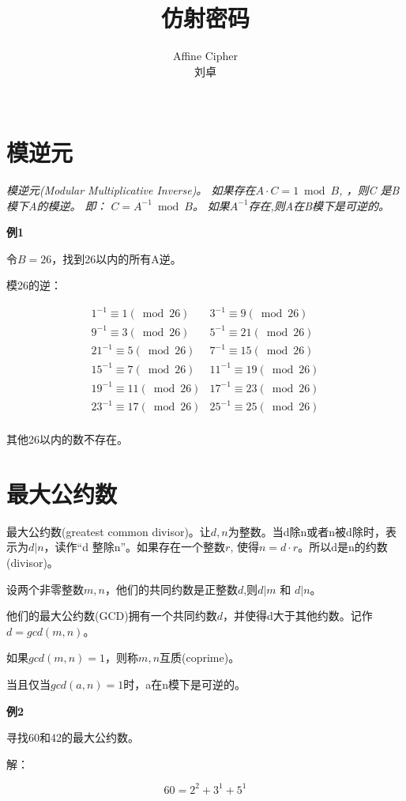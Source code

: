 \documentclass{article}
\date{}
\title{仿射密码}
\author{
Affine Cipher\\
 刘卓\\
 \texttt{ } \\
}
\begin{document}
\maketitle

\section{模逆元}
\textit{模逆元(Modular Multiplicative Inverse)。 如果存在$A \cdot C = 1 \bmod B$, ，则C
是B模下A的模逆。 即： $C = A^{-1} \bmod B$。}
\textit{
如果$A^{-1}$存在,则A在B模下是可逆的。
}

\textbf{例1}

令$B = 26$，找到26以内的所有A逆。

模26的逆：

$$
\begin{array}{cc}
 {1^{-1} \equiv 1(\bmod 26)} & 3^{-1} \equiv 9(\bmod 26) \\
 9^{-1} \equiv 3(\bmod 26) & 5^{-1} \equiv 21(\bmod 26) \\ 
 21^{-1} \equiv 5(\bmod 26) & 7^{-1} \equiv 15(\bmod 26) \\ 
 15^{-1} \equiv 7(\bmod 26) & 11^{-1} \equiv 19(\bmod 26) \\
 19^{-1} \equiv 11(\bmod 26) & 17^{-1} \equiv 23(\bmod 26)\\
 23^{-1} \equiv 17(\bmod 26) & 25^{-1} \equiv 25(\bmod 26)\\
\end{array}
$$

其他26以内的数不存在。

\section{最大公约数}
最大公约数(greatest common divisor)。让$d,n$为整数。当d除n或者n被d除时，表示为$d|n$，读作“d 整除n”。如果存在一个整数$r$, 使得$n=d \cdot r$。所以d是n的约数(divisor)。

设两个非零整数$m,n$，他们的共同约数是正整数$d$,则$d|m$ 和 $d|n$。

他们的最大公约数(GCD)拥有一个共同约数$d$，并使得d大于其他约数。记作$d = gcd(m,n)$。

如果$gcd(m,n) = 1$，则称$m,n$互质(coprime)。

当且仅当$gcd(a,n) = 1$时，a在n模下是可逆的。


\textbf{例2}

寻找60和42的最大公约数。

解：

$$60 = 2^{2} + 3^{1} + 5^{1}$$
\end{document}
